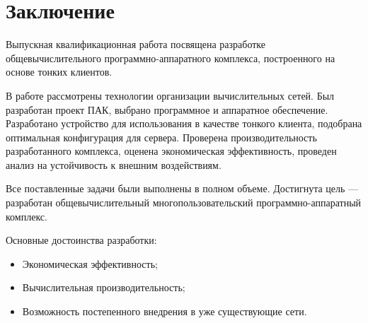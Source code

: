 \chapter*{Заключение}

Выпускная квалификационная работа посвящена разработке общевычислительного
программно-аппаратного комплекса, построенного на основе тонких клиентов.

В работе рассмотрены технологии организации вычислительных сетей. Был разработан проект
ПАК, выбрано программное и аппаратное обеспечение. Разработано устройство для
использования в качестве тонкого клиента, подобрана оптимальная конфигурация для
сервера. Проверена производительность разработанного комплекса, оценена экономическая
эффективность, проведен анализ на устойчивость к внешним воздействиям.

Все поставленные задачи были выполнены в полном объеме. Достигнута цель — разработан
общевычислительный многопользовательский программно-аппаратный комплекс.

Основные достоинства разработки:
\begin{itemize}
    \item Экономическая эффективность;
    \item Вычислительная производительность;
    \item Возможность постепенного внедрения в уже существующие сети.
\end{itemize}


